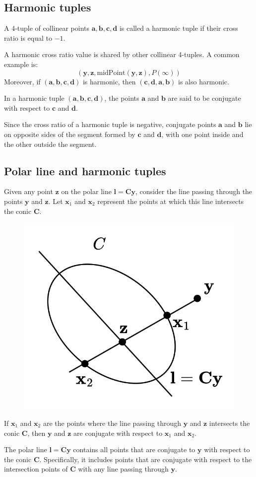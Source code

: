 \subsection{Harmonic tuples}
\begin{definition}
    A 4-tuple of collinear points $\mathbf{a}, \mathbf{b}, \mathbf{c}, \mathbf{d}$ is called a harmonic tuple if their cross ratio is equal to $-1$.
\end{definition}
A harmonic cross ratio value is shared by other collinear 4-tuples. 
A common example is:
\[\left( \mathbf{y},\mathbf{z},\text{midPoint}(\mathbf{y},\mathbf{z}),P(\infty) \right)\]
Moreover, if $(\mathbf{a}, \mathbf{b}, \mathbf{c}, \mathbf{d})$ is harmonic, then $(\mathbf{c}, \mathbf{d}, \mathbf{a}, \mathbf{b})$ is also harmonic. 
\begin{definition}
    In a harmonic tuple $(\mathbf{a}, \mathbf{b}, \mathbf{c}, \mathbf{d})$, the points $\mathbf{a}$ and $\mathbf{b}$ are said to be conjugate with respect to $\mathbf{c}$ and $\mathbf{d}$.
\end{definition}
Since the cross ratio of a harmonic tuple is negative, conjugate points $\mathbf{a}$ and $\mathbf{b}$ lie on opposite sides of the segment formed by $\mathbf{c}$ and $\mathbf{d}$, with one point inside and the other outside the segment.

\subsection{Polar line and harmonic tuples}
Given any point $\mathbf{z}$ on the polar line $\mathbf{l}=\mathbf{Cy}$, consider the line passing through the points $\mathbf{y}$ and $\mathbf{z}$. 
Let $\mathbf{x}_1$ and $\mathbf{x}_2$ represent the points at which this line intersects the conic $\mathbf{C}$. 
\begin{figure}[H]
    \centering
    \includegraphics[width=0.25\linewidth]{images/polarharmonic.png}
\end{figure}
\begin{theorem}
    If $\mathbf{x}_1$ and $\mathbf{x}_2$ are the points where the line passing through $\mathbf{y}$ and $\mathbf{z}$ intersects the conic $\mathbf{C}$, then $\mathbf{y}$ and $\mathbf{z}$ are conjugate with respect to $\mathbf{x}_1$ and $\mathbf{x}_2$.
\end{theorem}
The polar line $\mathbf{l}=\mathbf{Cy}$ contains all points that are conjugate to $\mathbf{y}$ with respect to the conic $\mathbf{C}$. 
Specifically, it includes points that are conjugate with respect to the intersection points of $\mathbf{C}$ with any line passing through $\mathbf{y}$.

